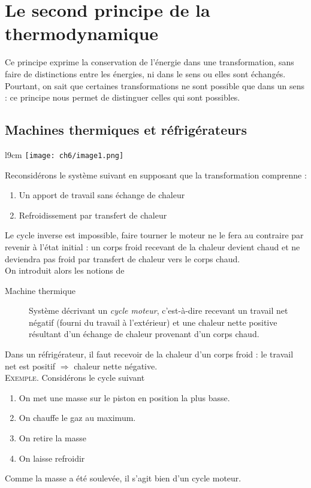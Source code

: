 \chapter{Le second principe de la thermodynamique} 
Ce principe exprime la conservation de l'énergie dans une transformation, 
sans faire de distinctions entre les énergies, ni dans le sens ou elles 
sont échangés. Pourtant, on sait que certaines transformations ne sont 
possible que dans un sens : ce principe nous permet de distinguer celles 
qui sont possibles.

	\section{Machines thermiques et réfrigérateurs}
	\begin{wrapfigure}[7]{l}{9cm}
	\vspace{-5mm}
	\texttt{[image: ch6/image1.png]}
	\end{wrapfigure}
	Reconsidérons le système suivant en supposant que la transformation 
	comprenne  :
	\begin{enumerate}
	\item Un apport de travail sans échange de chaleur
	\item Refroidissement par transfert de chaleur
	\end{enumerate}
	Le cycle inverse est impossible, faire tourner le moteur ne le fera 
	au contraire par revenir à l'état initial : un corps froid recevant 
	de la chaleur devient chaud et ne deviendra pas froid par transfert 
	de chaleur vers le corps chaud.\\
	On introduit alors les notions de 
	\begin{description}
	\item[Machine thermique] Système décrivant un \textit{cycle moteur}, 
	c'est-à-dire recevant un travail net négatif (fourni du travail à 
	l'extérieur) et une chaleur nette positive résultant d'un échange de 
	chaleur provenant d'un corps chaud.
	\end{description}
	Dans un réfrigérateur, il faut recevoir de la chaleur d'un corps 
	froid : le travail net est positif $\Rightarrow$ chaleur nette 
	négative.\\
	
	\textsc{Exemple}. Considérons le cycle suivant 
	\begin{enumerate}
	\item On met une masse sur le piston en position la plus basse.
	\item On chauffe le gaz au maximum.
	\item On retire la masse
	\item On laisse refroidir
	\end{enumerate}
	Comme la masse a été soulevée, il s'agit bien d'un cycle moteur.\\
	
